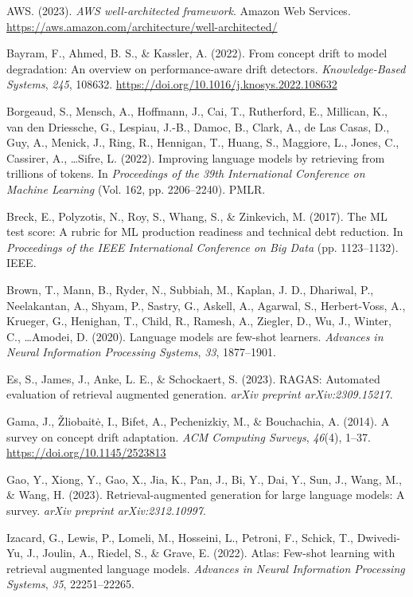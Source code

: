 \documentclass[12pt,a4paper]{report}
\begin{document}
{\raggedright
\setlength{\parskip}{8pt}
\everypar{\hangindent=0.5in}

AWS. (2023). \textit{AWS well-architected framework}. Amazon Web Services. \url{https://aws.amazon.com/architecture/well-architected/}

Bayram, F., Ahmed, B. S., \& Kassler, A. (2022). From concept drift to model degradation: An overview on performance-aware drift detectors. \textit{Knowledge-Based Systems}, \textit{245}, 108632. \url{https://doi.org/10.1016/j.knosys.2022.108632}

Borgeaud, S., Mensch, A., Hoffmann, J., Cai, T., Rutherford, E., Millican, K., van den Driessche, G., Lespiau, J.-B., Damoc, B., Clark, A., de Las Casas, D., Guy, A., Menick, J., Ring, R., Hennigan, T., Huang, S., Maggiore, L., Jones, C., Cassirer, A., \ldots Sifre, L. (2022). Improving language models by retrieving from trillions of tokens. In \textit{Proceedings of the 39th International Conference on Machine Learning} (Vol. 162, pp. 2206--2240). PMLR.

Breck, E., Polyzotis, N., Roy, S., Whang, S., \& Zinkevich, M. (2017). The ML test score: A rubric for ML production readiness and technical debt reduction. In \textit{Proceedings of the IEEE International Conference on Big Data} (pp. 1123--1132). IEEE.

Brown, T., Mann, B., Ryder, N., Subbiah, M., Kaplan, J. D., Dhariwal, P., Neelakantan, A., Shyam, P., Sastry, G., Askell, A., Agarwal, S., Herbert-Voss, A., Krueger, G., Henighan, T., Child, R., Ramesh, A., Ziegler, D., Wu, J., Winter, C., \ldots Amodei, D. (2020). Language models are few-shot learners. \textit{Advances in Neural Information Processing Systems}, \textit{33}, 1877--1901.

Es, S., James, J., Anke, L. E., \& Schockaert, S. (2023). RAGAS: Automated evaluation of retrieval augmented generation. \textit{arXiv preprint arXiv:2309.15217}.

Gama, J., \v{Z}liobait\.{e}, I., Bifet, A., Pechenizkiy, M., \& Bouchachia, A. (2014). A survey on concept drift adaptation. \textit{ACM Computing Surveys}, \textit{46}(4), 1--37. \url{https://doi.org/10.1145/2523813}

Gao, Y., Xiong, Y., Gao, X., Jia, K., Pan, J., Bi, Y., Dai, Y., Sun, J., Wang, M., \& Wang, H. (2023). Retrieval-augmented generation for large language models: A survey. \textit{arXiv preprint arXiv:2312.10997}.

Izacard, G., Lewis, P., Lomeli, M., Hosseini, L., Petroni, F., Schick, T., Dwivedi-Yu, J., Joulin, A., Riedel, S., \& Grave, E. (2022). Atlas: Few-shot learning with retrieval augmented language models. \textit{Advances in Neural Information Processing Systems}, \textit{35}, 22251--22265.

}
\end{document}
